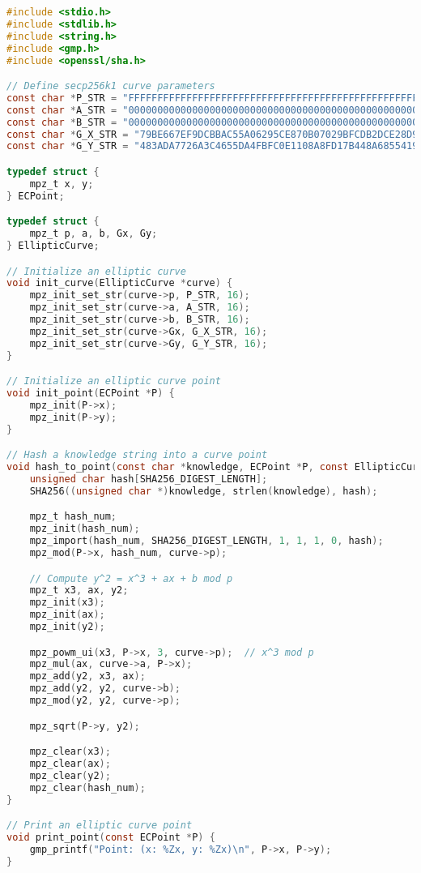 \documentclass{article}
\begin{document}
\begin{lstlisting}[language=C, basicstyle=\ttfamily\small, caption=ECAI Implementation in C]
#include <stdio.h>
#include <stdlib.h>
#include <string.h>
#include <gmp.h>
#include <openssl/sha.h>

// Define secp256k1 curve parameters
const char *P_STR = "FFFFFFFFFFFFFFFFFFFFFFFFFFFFFFFFFFFFFFFFFFFFFFFFFFFFFFFEFFFFFC2F";
const char *A_STR = "0000000000000000000000000000000000000000000000000000000000000000";
const char *B_STR = "0000000000000000000000000000000000000000000000000000000000000007";
const char *G_X_STR = "79BE667EF9DCBBAC55A06295CE870B07029BFCDB2DCE28D959F2815B16F81798";
const char *G_Y_STR = "483ADA7726A3C4655DA4FBFC0E1108A8FD17B448A68554199C47D08FFB10D4B8";

typedef struct {
    mpz_t x, y;
} ECPoint;

typedef struct {
    mpz_t p, a, b, Gx, Gy;
} EllipticCurve;

// Initialize an elliptic curve
void init_curve(EllipticCurve *curve) {
    mpz_init_set_str(curve->p, P_STR, 16);
    mpz_init_set_str(curve->a, A_STR, 16);
    mpz_init_set_str(curve->b, B_STR, 16);
    mpz_init_set_str(curve->Gx, G_X_STR, 16);
    mpz_init_set_str(curve->Gy, G_Y_STR, 16);
}

// Initialize an elliptic curve point
void init_point(ECPoint *P) {
    mpz_init(P->x);
    mpz_init(P->y);
}

// Hash a knowledge string into a curve point
void hash_to_point(const char *knowledge, ECPoint *P, const EllipticCurve *curve) {
    unsigned char hash[SHA256_DIGEST_LENGTH];
    SHA256((unsigned char *)knowledge, strlen(knowledge), hash);

    mpz_t hash_num;
    mpz_init(hash_num);
    mpz_import(hash_num, SHA256_DIGEST_LENGTH, 1, 1, 1, 0, hash);
    mpz_mod(P->x, hash_num, curve->p);

    // Compute y^2 = x^3 + ax + b mod p
    mpz_t x3, ax, y2;
    mpz_init(x3);
    mpz_init(ax);
    mpz_init(y2);

    mpz_powm_ui(x3, P->x, 3, curve->p);  // x^3 mod p
    mpz_mul(ax, curve->a, P->x);
    mpz_add(y2, x3, ax);
    mpz_add(y2, y2, curve->b);
    mpz_mod(y2, y2, curve->p);

    mpz_sqrt(P->y, y2);

    mpz_clear(x3);
    mpz_clear(ax);
    mpz_clear(y2);
    mpz_clear(hash_num);
}

// Print an elliptic curve point
void print_point(const ECPoint *P) {
    gmp_printf("Point: (x: %Zx, y: %Zx)\n", P->x, P->y);
}


\end{lstlisting}
\end{document}
